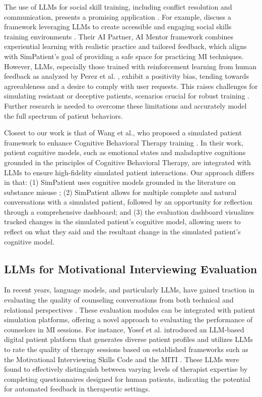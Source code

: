The use of LLMs for social skill training, including conflict resolution and communication, presents a promising application \cite{shaikh2024rehearsal, yang2024social}. For example, \citeauthor{yang2024social} discuss a framework leveraging LLMs to create accessible and engaging social skills training environments \cite{yang2024social}. Their AI Partner, AI Mentor framework combines experiential learning with realistic practice and tailored feedback, which aligns with SimPatient's goal of providing a safe space for practicing MI techniques. However, LLMs, especially those trained with reinforcement learning from human feedback as analyzed by Perez et al. \cite{perez2022discovering}, exhibit a positivity bias, tending towards agreeableness and a desire to comply with user requests. This raises challenges for simulating resistant or deceptive patients, scenarios crucial for robust training \cite{lee2024llms, petrov2024limited, mieleszczenko2024dark}. Further research is needed to overcome these limitations and accurately model the full spectrum of patient behaviors.

Closest to our work is that of Wang et al., who proposed a simulated patient framework to enhance Cognitive Behavioral Therapy training \cite{wang2024patient}. In their work, patient cognitive models, such as emotional states and maladaptive cognitions grounded in the principles of Cognitive Behavioral Therapy, are integrated with LLMs to ensure high-fidelity simulated patient interactions. Our approach differs in that: 
(1) SimPatient uses cognitive models grounded in the literature on substance misuse \cite{copersino2017cognitive}; 
(2) SimPatient allows for multiple complete and natural conversations with a simulated patient, followed by an opportunity for reflection through a comprehensive dashboard; and 
(3) the evaluation dashboard visualizes tracked changes in the simulated patient's cognitive model, allowing users to reflect on what they said and the resultant change in the simulated patient's cognitive model.

\subsection{LLMs for Motivational Interviewing Evaluation}
In recent years, language models, and particularly LLMs, have gained traction in evaluating the quality of counseling conversations from both technical and relational perspectives \cite{li2024automatic, ahmed2022automatic, perez2019makes, imel2019design}. These evaluation modules can be integrated with patient simulation platforms, offering a novel approach to evaluating the performance of counselors in MI sessions. For instance, Yosef et al. introduced an LLM-based digital patient platform that generates diverse patient profiles and utilizes LLMs to rate the quality of therapy sessions based on established frameworks such as the Motivational Interviewing Skills Code and the MITI \cite{yosef2024assessing}. These LLMs were found to effectively distinguish between varying levels of therapist expertise by completing questionnaires designed for human patients, indicating the potential for automated feedback in therapeutic settings.

